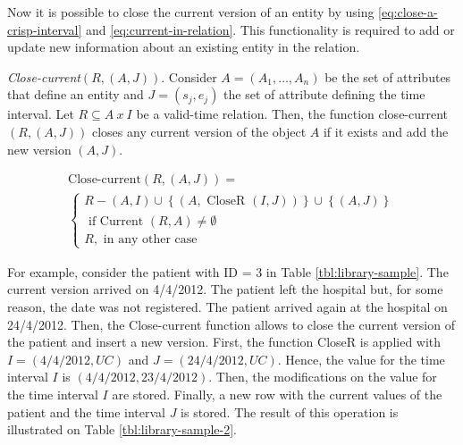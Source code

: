 Now it is possible to close the current version of an entity by using \eqref{eq:close-a-crisp-interval} and \eqref{eq:current-in-relation}. This functionality is required to add or update new information about an existing entity in the relation.

\begin{definition}
\label{def:close-current-version}
\emph{Close-current$\left(R, \left(A, J  \right)\right)$}.
Consider $A=\left(A_1, \ldots, A_n \right)$ be the set of attributes that define an entity and $J = \left(s_j,e_j \right)$ the set of attribute defining the time interval. Let $R \subseteq A\  x\  I$ be a valid-time relation. Then, the function close-current$\left(R,\left(A,J\right) \right)$ closes any current version of the object $A$ if it exists and add the new version $\left(A, J\right)$.

\begin{eqnarray}
\label{eq:close-current}
\text{Close-current} \left(R, \left(A, J\right) \right) =\\
\begin{cases}
\nonumber
R - \left(A, I \right) \cup \left \lbrace \left(A, \mbox{ CloseR } \left(I, J\right) \right)\right \rbrace \cup \left \lbrace\left(A, J\right) \right \rbrace  \\
\nonumber
\mbox{ if  Current } \left(R, A \right) \neq \emptyset\\ %
\nonumber R , \text{ in any other case}
\end{cases}
\end{eqnarray}
\end{definition}

For example, consider the patient with ID = 3 in Table \ref{tbl:library-sample}. The current version arrived on 4/4/2012. The patient left the hospital but, for some reason, the date  was not registered. The patient arrived again at the hospital on 24/4/2012. Then, the Close-current function allows to close the current version of the patient and insert a new version. First, the function CloseR is applied with $I = \left(4/4/2012, UC \right)$ and $J = \left(24/4/2012, UC \right)$. Hence, the value for the time interval $I$ is $ \left(4/4/2012, 23/4/2012 \right)$. Then, the modifications on the value for the time interval $I$ are stored. Finally, a new row with the current values of the patient and the time interval $J$ is stored.
The result of this operation is illustrated on Table \ref{tbl:library-sample-2}.




